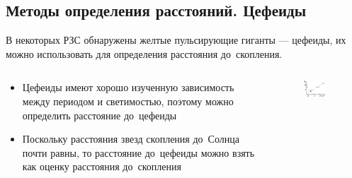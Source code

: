 \documentclass{beamer}
\begin{document}
    \subsection{Методы определения расстояний. Цефеиды}
    \begin{frame}
        В некоторых РЗС обнаружены желтые пульсирующие гиганты --- цефеиды, их можно использовать для определения расстояния до~скопления.
        \begin{columns}
            \begin{column}{0.6\textwidth}
                \begin{itemize}
                    \item Цефеиды имеют хорошо изученную зависимость между периодом и светимостью, поэтому можно определить расстояние до~цефеиды
                    \item Поскольку расстояния звезд скопления до~Солнца почти равны, 
                    то расстояние до~цефеиды можно взять как оценку расстояния до~скопления
                \end{itemize}
            \end{column}
            \begin{column}{0.4\textwidth}
                \begin{figure}
                \centering
                    \includegraphics[width=0.7\textwidth]{pictures/Cep.jpg}
                \end{figure}
            \end{column}
        \end{columns}
    \end{frame}
\end{document}
